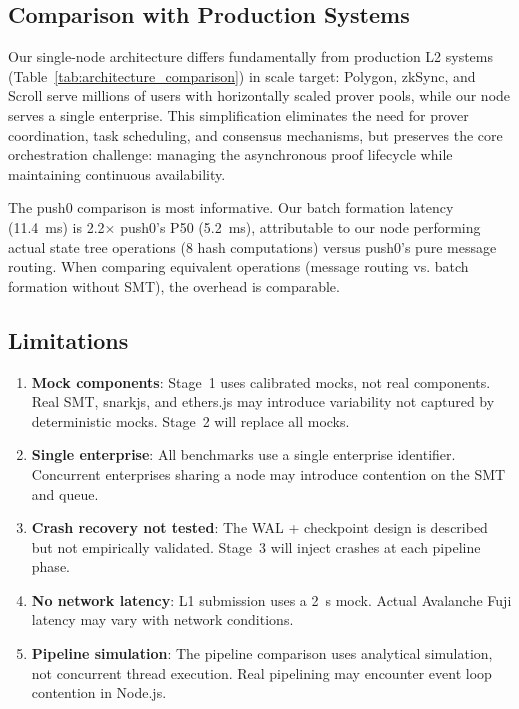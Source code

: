 \subsection{Comparison with Production Systems}

Our single-node architecture differs fundamentally from production L2
systems (Table~\ref{tab:architecture_comparison}) in scale target:
Polygon, zkSync, and Scroll serve millions of users with horizontally
scaled prover pools, while our node serves a single enterprise. This
simplification eliminates the need for prover coordination, task
scheduling, and consensus mechanisms, but preserves the core
orchestration challenge: managing the asynchronous proof lifecycle while
maintaining continuous availability.

The push0 comparison is most informative. Our batch formation latency
(11.4~ms) is 2.2$\times$ push0's P50 (5.2~ms), attributable to our
node performing actual state tree operations (8 hash computations) versus
push0's pure message routing. When comparing equivalent operations
(message routing vs. batch formation without SMT), the overhead is
comparable.

\subsection{Limitations}

\begin{enumerate}
\item \textbf{Mock components}: Stage~1 uses calibrated mocks, not real
  components. Real SMT, snarkjs, and ethers.js may introduce variability
  not captured by deterministic mocks. Stage~2 will replace all mocks.

\item \textbf{Single enterprise}: All benchmarks use a single enterprise
  identifier. Concurrent enterprises sharing a node may introduce
  contention on the SMT and queue.

\item \textbf{Crash recovery not tested}: The WAL + checkpoint design
  is described but not empirically validated. Stage~3 will inject crashes
  at each pipeline phase.

\item \textbf{No network latency}: L1 submission uses a 2~s mock.
  Actual Avalanche Fuji latency may vary with network conditions.

\item \textbf{Pipeline simulation}: The pipeline comparison uses
  analytical simulation, not concurrent thread execution. Real pipelining
  may encounter event loop contention in Node.js.
\end{enumerate}
